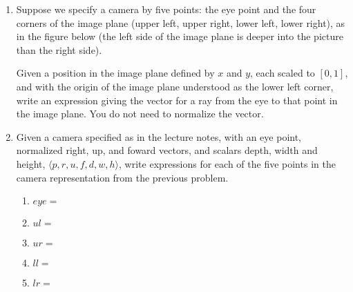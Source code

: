 \documentclass{article}
\begin{document}
\begin{enumerate}
  \newpage
  
\item Suppose we specify a camera by five points: the eye point and the four corners of
  the image plane (upper left, upper right, lower left, lower right),
  as in the figure below (the left side of the image plane is deeper
  into the picture than the right side). 

    \tikzset{>=latex}

Given a position in the image plane defined by $x$ and $y$, each
scaled to $[0,1]$, and with the origin of the image plane understood
as the lower left corner, write an expression giving the vector for a
ray from the eye to that point in the image plane.  You do not need to
normalize the vector.

\vfill

\item Given a camera specified as in the lecture notes, with an eye
  point, normalized right, up, and foward vectors, and scalars depth,
  width and height, $\langle p, r, u, f, d, w, h\rangle$, write
  expressions for each of the five points in the camera representation
  from the previous problem.
  \begin{enumerate}
  \item $eye =$
\vfill
    \item $ul = $
\vfill
    \item $ur = $
\vfill
    \item $ll = $
\vfill
    \item $lr = $
\vfill
  \end{enumerate}
  
\end{enumerate}
\end{document}
